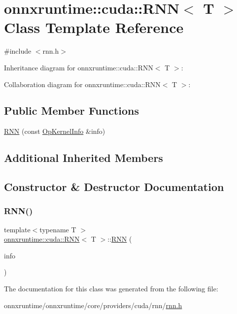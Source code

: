 \hypertarget{classonnxruntime_1_1cuda_1_1RNN}{}\section{onnxruntime\+:\+:cuda\+:\+:R\+NN$<$ T $>$ Class Template Reference}
\label{classonnxruntime_1_1cuda_1_1RNN}


{\ttfamily \#include $<$rnn.\+h$>$}



Inheritance diagram for onnxruntime\+:\+:cuda\+:\+:R\+NN$<$ T $>$\+:


Collaboration diagram for onnxruntime\+:\+:cuda\+:\+:R\+NN$<$ T $>$\+:
\subsection*{Public Member Functions}
\begin{DoxyCompactItemize}
\item 
\mbox{\hyperlink{classonnxruntime_1_1cuda_1_1RNN_a429c989cd478008e94f48cb92dd589ff}{R\+NN}} (const \mbox{\hyperlink{classonnxruntime_1_1OpKernelInfo}{Op\+Kernel\+Info}} \&info)
\end{DoxyCompactItemize}
\subsection*{Additional Inherited Members}


\subsection{Constructor \& Destructor Documentation}
\mbox{\label{classonnxruntime_1_1cuda_1_1RNN_a429c989cd478008e94f48cb92dd589ff}} 
\subsubsection{\texorpdfstring{R\+N\+N()}{RNN()}}
{\footnotesize\ttfamily template$<$typename T $>$ \\
\mbox{\hyperlink{classonnxruntime_1_1cuda_1_1RNN}{onnxruntime\+::cuda\+::\+R\+NN}}$<$ T $>$\+::\mbox{\hyperlink{classonnxruntime_1_1cuda_1_1RNN}{R\+NN}} (\begin{DoxyParamCaption}\item[{const \mbox{\hyperlink{classonnxruntime_1_1OpKernelInfo}{Op\+Kernel\+Info}} \&}]{info }\end{DoxyParamCaption})\hspace{0.3cm}{\ttfamily [inline]}}



The documentation for this class was generated from the following file\+:\begin{DoxyCompactItemize}
\item 
onnxruntime/onnxruntime/core/providers/cuda/rnn/\mbox{\hyperlink{cuda_2rnn_2rnn_8h}{rnn.\+h}}\end{DoxyCompactItemize}
